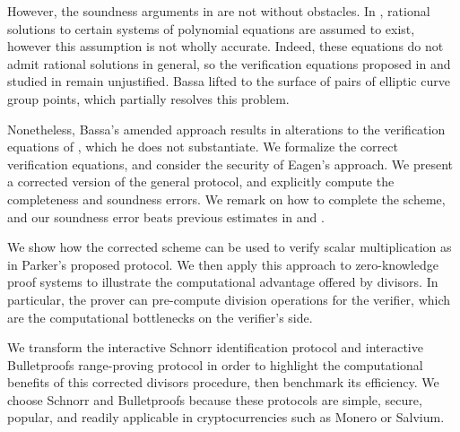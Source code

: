 \documentclass[11pt,letterpaper]{article}
\theoremstyle{definition}
\newcommand{\6}{\mathbf}
\newcommand{\7}{\mathcal}
\begin{document}


However, the soundness arguments in \cite{SoundnessForDLP} are not without  obstacles. In \cite{Eagen}, rational solutions to certain systems of polynomial equations are assumed to exist, however this assumption is not wholly accurate.
Indeed, these equations do not admit rational solutions in general, so the verification equations proposed in \cite{Eagen} and studied in \cite{SoundnessForDLP} remain unjustified. Bassa lifted to the surface of pairs of elliptic curve group points, which partially resolves this problem. 

Nonetheless, Bassa's amended approach results in alterations to the verification equations of \cite{Eagen}, which he does not substantiate. We formalize the correct verification equations, and consider the security of Eagen's approach. We present a corrected version of the general protocol, and explicitly compute the completeness and soundness errors. We remark on how to complete the scheme, and our soundness error beats previous estimates in \cite{Eagen} and \cite{SoundnessForDLP}.

We show how the corrected scheme can be used to verify scalar multiplication as in Parker's proposed protocol.
We then apply this approach to zero-knowledge proof systems to illustrate the computational advantage offered by divisors. 
In particular, the prover can pre-compute division operations for the verifier, which are the computational bottlenecks on the verifier's side.


We transform the interactive Schnorr identification protocol \cite{Schnorr} and interactive Bulletproofs range-proving protocol \cite{Bullet} in order to highlight the computational benefits of this corrected divisors procedure, then benchmark its efficiency.
We choose Schnorr and Bulletproofs because these protocols are simple, secure, popular, and readily applicable in cryptocurrencies such as Monero or Salvium.  
\end{document}
